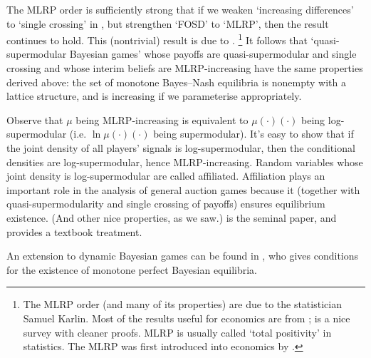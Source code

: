 \documentclass[11pt,letterpaper,reqno,oneside]{article}
\begin{document}


The MLRP order is sufficiently strong that if we weaken `increasing differences' to `single crossing' in , but strengthen `FOSD' to `MLRP', then the result continues to hold. This (nontrivial) result is due to \textcite{KarlinRubin1956}.%
	\footnote{The MLRP order (and many of its properties) are due to the statistician Samuel Karlin. Most of the results useful for economics are from \textcite{KarlinRubin1956}; \textcite{KarlinRinott1980} is a nice survey with cleaner proofs. MLRP is usually called `total positivity' in statistics. The MLRP was first introduced into economics by \textcite{Milgrom1981bell}.}
It follows that `quasi-supermodular Bayesian games' whose payoffs are quasi-supermodular and single crossing and whose interim beliefs are MLRP-increasing have the same properties derived above: the set of monotone Bayes--Nash equilibria is nonempty with a lattice structure, and is increasing if we parameterise appropriately.

Observe that $\mu$ being MLRP-increasing is equivalent to $\mu(\cdot)(\cdot)$ being log-supermodular (i.e. $\ln \mu(\cdot)(\cdot)$ being supermodular). It's easy to show that if the joint density of all players' signals is log-supermodular, then the conditional densities are log-supermodular, hence MLRP-increasing. Random variables whose joint density is log-supermodular are called affiliated. Affiliation plays an important role in the analysis of general auction games because it (together with quasi-supermodularity and single crossing of payoffs) ensures equilibrium existence. (And other nice properties, as we saw.) \textcite{MilgromWeber1982} is the seminal paper, and \textcite[][ch. 6]{Krishna2010} provides a textbook treatment.

An extension to dynamic Bayesian games can be found in \textcite{Mensch2016}, who gives conditions for the existence of monotone perfect Bayesian equilibria.



\pagebreak
\end{document}

